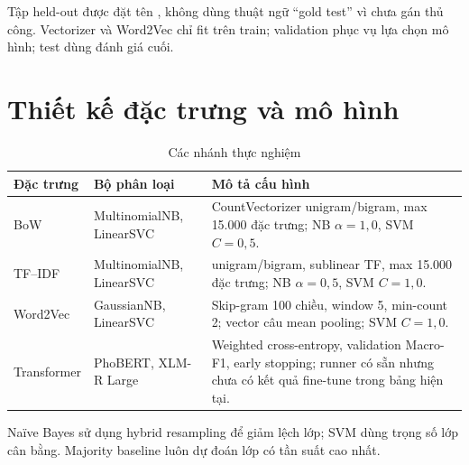 Tập held-out được đặt tên , không dùng thuật ngữ ``gold test'' vì chưa gán thủ công. Vectorizer và Word2Vec chỉ fit trên train; validation phục vụ lựa chọn mô hình; test dùng đánh giá cuối.

\section{Thiết kế đặc trưng và mô hình}
\begin{table}[H]
\centering
\caption{Các nhánh thực nghiệm}
\label{tab:experiments}
\begin{tabularx}{\textwidth}{p{2.5cm}p{4.1cm}Y}
\toprule
Đặc trưng & Bộ phân loại & Mô tả cấu hình \\
\midrule
BoW & MultinomialNB, LinearSVC & CountVectorizer unigram/bigram, max 15.000 đặc trưng; NB $\alpha=1,0$, SVM $C=0,5$. \\
TF--IDF & MultinomialNB, LinearSVC & unigram/bigram, sublinear TF, max 15.000 đặc trưng; NB $\alpha=0,5$, SVM $C=1,0$. \\
Word2Vec & GaussianNB, LinearSVC & Skip-gram 100 chiều, window 5, min-count 2; vector câu mean pooling; SVM $C=1,0$. \\
Transformer & PhoBERT, XLM-R Large & Weighted cross-entropy, validation Macro-F1, early stopping; runner có sẵn nhưng chưa có kết quả fine-tune trong bảng hiện tại. \\
\bottomrule
\end{tabularx}
\end{table}
Naïve Bayes sử dụng hybrid resampling để giảm lệch lớp; SVM dùng trọng số lớp cân bằng. Majority baseline luôn dự đoán lớp có tần suất cao nhất.

